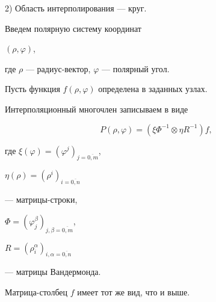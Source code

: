 2) Область интерполирования --- круг.


Введем полярную систему координат


$(\rho,\varphi)$,


где  $\rho$ --- радиус-вектор, $\varphi$ --- полярный угол.


Пусть функция $f(\rho,\varphi)$ определена в заданных узлах.





Интерполяционный многочлен записываем в виде


$$


P(\rho,\varphi)=(\xi\Phi^{-1}\otimes\eta R^{-1} )f,


$$


где $\xi(\varphi)=(\varphi^{j})_{j=\overline{0,m}}$,


$\eta(\rho)=(\rho^{i})_{i=\overline{0,n}}$


--- матрицы-строки,


$\Phi=(\varphi_{j}^{\beta})_{j,\beta=\overline{0,m}}$,


$R=(\rho_{i}^{\alpha})_{i,\alpha=\overline{0,n}}$


--- матрицы Вандермонда.





Матрица-столбец $f$ имеет тот же вид, что и выше.





